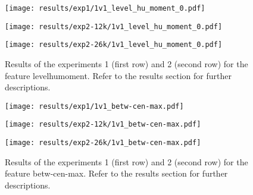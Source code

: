  
\begin{figure}[h!]
    \centering
	\begin{minipage}{0.3\linewidth}
		\texttt{[image: results/exp1/1v1\_level\_hu\_moment\_0.pdf]}
	\end{minipage}

	\begin{minipage}{0.3\linewidth}
		\texttt{[image: results/exp2-12k/1v1\_level\_hu\_moment\_0.pdf]}
	\end{minipage}
	\begin{minipage}{0.3\linewidth}
		\texttt{[image: results/exp2-26k/1v1\_level\_hu\_moment\_0.pdf]}
	\end{minipage}

	\caption[ Results: Feature level\textunderscore hu\textunderscore moment]{ Results of the experiments 1 (first row) and 2 (second row) for the feature level\textunderscore hu\textunderscore moment. Refer to the results section for further descriptions. }
	\label{fig:appendix_level_hu_moment_0}
\end{figure}
 
\begin{figure}[h!]
    \centering
	\begin{minipage}{0.3\linewidth}
		\texttt{[image: results/exp1/1v1\_betw-cen-max.pdf]}
	\end{minipage}

	\begin{minipage}{0.3\linewidth}
		\texttt{[image: results/exp2-12k/1v1\_betw-cen-max.pdf]}
	\end{minipage}
	\begin{minipage}{0.3\linewidth}
		\texttt{[image: results/exp2-26k/1v1\_betw-cen-max.pdf]}
	\end{minipage}

	\caption[ Results: Feature betw-cen-max]{ Results of the experiments 1 (first row) and 2 (second row) for the feature betw-cen-max. Refer to the results section for further descriptions. }
	\label{fig:appendix_betw-cen-max}
\end{figure}
 \newpage 


